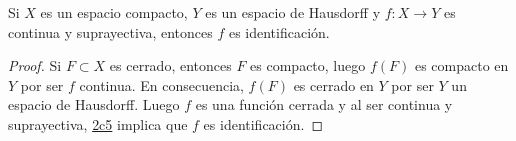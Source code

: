 
\begin{theorem}
Si $X$ es un espacio compacto, $Y$ es un espacio de Hausdorff y $f : X \longrightarrow Y$ es continua y suprayectiva, entonces $f$ es identificación.
\end{theorem}

\begin{proof}
Si $F \subset X$ es cerrado, entonces $F$ es compacto, luego $f(F)$ es compacto en $Y$ por ser $f$ continua. En consecuencia, $f(F)$ es cerrado en $Y$ por ser $Y$ un espacio de Hausdorff. Luego $f$ es una función cerrada y al ser continua y suprayectiva, \hyperref[card:2c5]{\textsf{2c5}} implica que $f$ es identificación.
\end{proof}
